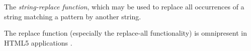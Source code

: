 %
%

The \emph{string-replace function}, 
which may be used to replace all occurrences of a string matching a pattern by 
another string. 

The replace function (especially 
the replace-all functionality) is omnipresent in HTML5 applications
\cite{LB16,TCJ16,YABI14}. 


